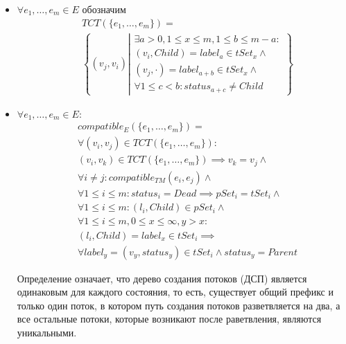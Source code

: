\begin{itemize}
\item $\forall e_1, \dots, e_m \in E$ обозначим
\begin{equation}
\label{tct}
\begin{aligned}
& TCT(\{e_1, \dots, e_m\}) = \\
& \left\lbrace (v_j, v_i) \left|
\begin{array}{c}
\exists a > 0, 1 \le x \le m, 1 \le b \le m - a: \\
(v_i, Child) = label_a \in tSet_x \land \\
(v_j, \cdot) = label_{a+b} \in tSet_x \land \\
\forall 1 \le c < b: status_{a+c} \neq Child
\end{array}
\right.
\right\rbrace
\end{aligned}
\end{equation}

\item $\forall e_1, \dots, e_m \in E:$
\begin{equation}
\label{compatible_E_thread_M}
\begin{aligned}
& compatible_{E}(\{e_1, \dots, e_m\}) = \\
& \forall (v_i, v_j) \in TCT(\{e_1, \dots, e_m\}): \\
& (v_i, v_k) \in TCT(\{e_1, \dots, e_m\}) \implies v_k = v_j \land \\
& \forall i \neq j: compatible_{TM}(e_i, e_j) \land \\
& \forall 1 \le i \le m: status_i = Dead \implies pSet_i = tSet_i \land \\
& \forall 1 \le i \le m: (l_i, Child) \in pSet_i \land \\
& \forall 1 \le i \le m, 0 \le x \le \infty, y > x: \\
& (l_i, Child) = label_x \in tSet_i \implies \\
& \forall label_y = (v_y, status_y) \in tSet_i \land status_y = Parent
\end{aligned}
\end{equation}

Определение означает, что дерево создания потоков (ДСП) является одинаковым для каждого состояния, то есть, существует общий префикс и только один поток, в котором путь создания потоков разветвляется на два, а все остальные потоки, которые возникают после раветвления, являются уникальными.


\end{itemize}
